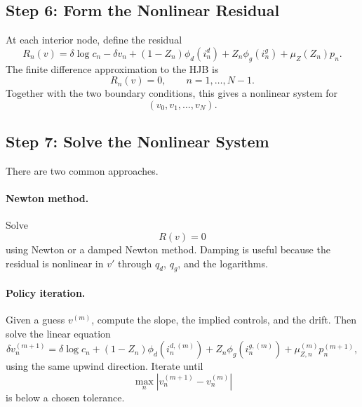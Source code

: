 \documentclass[11pt]{article}
\begin{document}
\subsection{Step 6: Form the Nonlinear Residual}

At each interior node, define the residual
\begin{equation}
    R_n(v)
    =
    \delta\log c_n
    -\delta v_n
    +(1-Z_n)\phi_d(i^d_n)
    +Z_n\phi_g(i^g_n)
    +
    \mu_Z(Z_n) p_n.
\end{equation}
The finite difference approximation to the HJB is
\begin{equation}
    R_n(v)=0,
    \qquad n=1,\ldots,N-1.
\end{equation}
Together with the two boundary conditions, this gives a nonlinear system for
\begin{equation}
    (v_0,v_1,\ldots,v_N).
\end{equation}

\subsection{Step 7: Solve the Nonlinear System}

There are two common approaches.

\paragraph{Newton method.}
Solve
\begin{equation}
    R(v)=0
\end{equation}
using Newton or a damped Newton method. Damping is useful because the residual is nonlinear in $v'$ through $q_d$, $q_g$, and the logarithms.

\paragraph{Policy iteration.}
Given a guess $v^{(m)}$, compute the slope, the implied controls, and the drift. Then solve the linear equation
\begin{equation}
    \delta v^{(m+1)}_n
    =
    \delta\log c_n
    +(1-Z_n)\phi_d(i^{d,(m)}_n)
    +Z_n\phi_g(i^{g,(m)}_n)
    +\mu^{(m)}_{Z,n}p^{(m+1)}_n,
\end{equation}
using the same upwind direction. Iterate until
\begin{equation}
    \max_n |v^{(m+1)}_n-v^{(m)}_n|
\end{equation}
is below a chosen tolerance.
\end{document}
